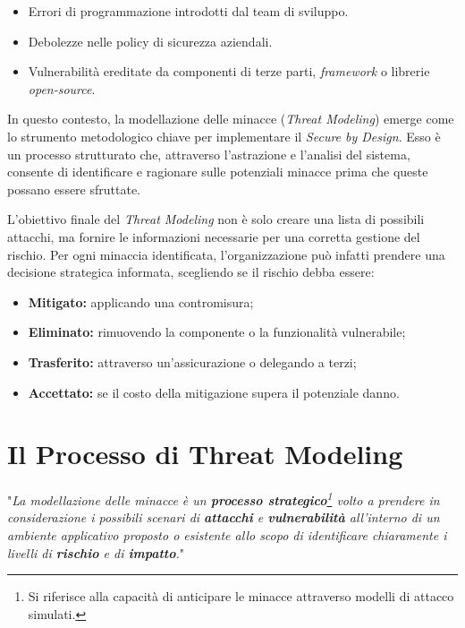 \begin{itemize}
    \item Errori di programmazione introdotti dal team di sviluppo.
    \item Debolezze nelle policy di sicurezza aziendali.
    \item Vulnerabilità ereditate da componenti di terze parti, \textit{framework} o librerie \textit{open-source}.
\end{itemize}


In questo contesto, la modellazione delle minacce (\textit{Threat Modeling}) emerge come lo strumento metodologico chiave per implementare il \textit{Secure by Design}. Esso è un processo strutturato che, attraverso l'astrazione e l'analisi del sistema, consente di identificare e ragionare sulle potenziali minacce prima che queste possano essere sfruttate.


L'obiettivo finale del \textit{Threat Modeling} non è solo creare una lista di possibili attacchi, ma fornire le informazioni necessarie per una corretta gestione del rischio. Per ogni minaccia identificata, l'organizzazione può infatti prendere una decisione strategica informata, scegliendo se il rischio debba essere:

\begin{itemize}
    \item \textbf{Mitigato:} applicando una contromisura;
    \item \textbf{Eliminato:} rimuovendo la componente o la funzionalità vulnerabile;
    \item \textbf{Trasferito:} attraverso un'assicurazione o delegando a terzi;
    \item \textbf{Accettato:} se il costo della mitigazione supera il potenziale danno.
\end{itemize}





\section{Il Processo di Threat Modeling}


"\textit{La modellazione delle minacce è un \textbf{processo strategico}\footnote{Si riferisce alla capacità di anticipare le minacce attraverso modelli di attacco simulati.} volto a prendere in considerazione i possibili scenari di  \textbf{attacchi} e \textbf{vulnerabilità} all'interno di un ambiente applicativo proposto o esistente allo scopo di identificare chiaramente i livelli di \textbf{rischio} e di \textbf{impatto}.}" \cite{libro-threat-modelling}

